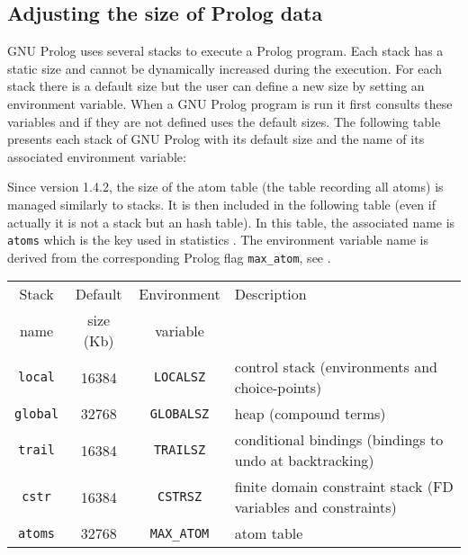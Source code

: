 \subsection{Adjusting the size of Prolog data}
\label{Adjusting-the-size-of-Prolog-stacks}
GNU Prolog uses several stacks to execute a Prolog program. Each stack has a
static size and cannot be dynamically increased during the execution. For
each stack there is a default size but the user can define a new size by
setting an environment variable. When a GNU Prolog program is run it first
consults these variables and if they are not defined uses the default sizes.
The following table presents each stack of GNU Prolog with its default size
and the name of its associated environment variable:

Since version 1.4.2, the size of the atom table (the table recording all atoms) 
is managed similarly to stacks. It is then included in the following table
(even if actually it is not a stack but an hash table).
In this table, the associated name is \texttt{atoms} which is the key used in statistics 
. The environment variable name is derived from the corresponding Prolog flag 
\texttt{max\_atom}, see .


\begin{tabular}{|c|c|c|l|}
\hline

Stack & Default   & Environment & Description \\
name  & size (Kb) & variable    & \\

\hline\hline

\texttt{local} & 16384 & \texttt{LOCALSZ} & control stack (environments
and choice-points) \\

\hline

\texttt{global} & 32768 & \texttt{GLOBALSZ} & heap (compound terms) \\

\hline

\texttt{trail} & 16384 & \texttt{TRAILSZ} & conditional bindings (bindings
to undo at backtracking) \\

\hline

\texttt{cstr} & 16384 & \texttt{CSTRSZ} & finite domain constraint stack
(FD variables and constraints) \\

\hline

\texttt{atoms} & 32768 & \texttt{MAX\_ATOM} & atom table \\

\hline
\end{tabular}

